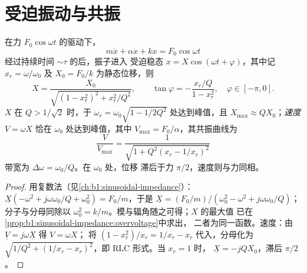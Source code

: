 \section{受迫振动与共振}

\begin{theorem}[正弦驱动振子]\label{thm:b1:oscillators-resonance:forced}
在力 $F_0\cos\omega t$ 的驱动下，
\[
m\ddot x + \alpha\dot x + kx = F_0\cos\omega t
\]
经过持续时间 $\sim\tau$ 的后，振子进入
受迫稳态 $x = X\cos(\omega t + \varphi)$，其中记 $x_r = \omega/\omega_0$
及 $X_0 = F_0/k$ 为静态位移，则
\[
X = \frac{X_0}{\sqrt{(1 - x_r^2)^2 + x_r^2/Q^2}}, \qquad
\tan\varphi = -\frac{x_r/Q}{1 - x_r^2}, \quad \varphi \in [-\pi, 0] .
\]
\emph{} $X$ 在 $Q > 1/\sqrt2$ 时，于 $\omega_r =
\omega_0\sqrt{1 - 1/2Q^2}$ 处达到峰值，且 $X_{\max} \approx QX_0$；\emph{速度
} $V = \omega X$ 恰在 $\omega_0$ 处达到峰值，其中 $V_{\max} =
F_0/\alpha$，其共振曲线为
\[
\frac{V}{V_{\max}} = \frac{1}{\sqrt{1 + Q^2(x_r - 1/x_r)^2}}
\]
带宽为 $\Delta\omega = \omega_0/Q$。在 $\omega_0$ 处，位移
滞后于力 $\pi/2$，速度则与力同相。
\end{theorem}

\begin{proof}
用复数法（见\cref{ch:b1:sinusoidal-impedance}）：$\underline X(-\omega^2
+ j\omega\omega_0/Q + \omega_0^2) = F_0/m$，于是 $\underline X = (F_0/m)/(\omega_0^2
- \omega^2 + j\omega\omega_0/Q)$；分子与分母同除以
$\omega_0^2 = k/m$。模与辐角随之可得；$X$ 的最大值
已在\cref{prop:b1:sinusoidal-impedance:overvoltage}中求出，
二者为同一函数。速度：由 $\underline V = j\omega\underline X$ 得 $V = \omega X$；
将 $(1 - x_r^2)/x_r = 1/x_r - x_r$ 代入，分母化为
$\sqrt{1/Q^2 + (1/x_r - x_r)^2}$，即 RLC 形式。当 $x_r = 1$ 时，
$\underline X = -jQX_0$，滞后 $\pi/2$。
\end{proof}

